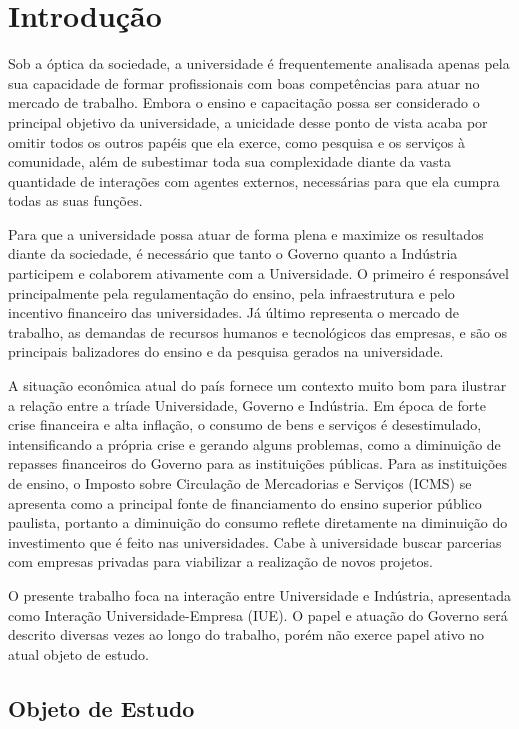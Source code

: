 \chapter[Introdução]{Introdução}
\label{chap:introducao}

Sob a óptica da sociedade, a universidade é frequentemente analisada apenas pela sua capacidade de formar profissionais com boas competências para atuar no mercado de trabalho. Embora o ensino e capacitação possa ser considerado o principal objetivo da universidade, a unicidade desse ponto de vista acaba por omitir todos os outros papéis que ela exerce, como pesquisa e os serviços à comunidade, além de subestimar toda sua complexidade diante da vasta quantidade de interações com agentes externos, necessárias para que ela cumpra todas as suas funções.

Para que a universidade possa atuar de forma plena e maximize os resultados diante da sociedade, é necessário que tanto o Governo quanto a Indústria participem e colaborem ativamente com a Universidade. O primeiro é responsável principalmente pela regulamentação do ensino, pela infraestrutura e pelo incentivo financeiro das universidades. Já último representa o mercado de trabalho, as demandas de recursos humanos e tecnológicos das empresas, e são os principais balizadores do ensino e da pesquisa gerados na universidade. 

A situação econômica atual do país fornece um contexto muito bom para ilustrar a relação entre a tríade Universidade, Governo e Indústria. Em época de forte crise financeira e alta inflação, o consumo de bens e serviços é desestimulado, intensificando a própria crise e gerando alguns problemas, como a diminuição de repasses financeiros do Governo para as instituições públicas. Para as instituições de ensino, o Imposto sobre Circulação de Mercadorias e Serviços (ICMS) se apresenta como a principal fonte de financiamento do ensino superior público paulista, portanto a diminuição do consumo reflete diretamente na diminuição do investimento que é feito nas universidades. Cabe à universidade buscar parcerias com empresas privadas para viabilizar a realização de novos projetos.

O presente trabalho foca na interação entre Universidade e Indústria, apresentada como Interação Universidade-Empresa (IUE). O papel e atuação do Governo será descrito diversas vezes ao longo do trabalho, porém não exerce papel ativo no atual objeto de estudo.

\section{Objeto de Estudo}

